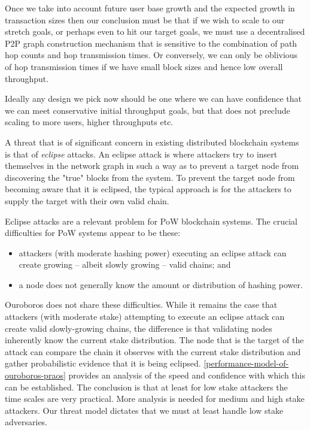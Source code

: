 \documentclass[11pt,a4paper]{article}
\begin{document}
Once we take into account future user base growth and the expected
growth in transaction sizes then our conclusion must be that if we wish
to scale to our stretch goals, or perhaps even to hit our target goals,
we must use a decentralised P2P graph construction mechanism that is
sensitive to the combination of path hop counts and hop transmission
times. Or conversely, we can only be oblivious of hop transmission times
if we have small block sizes and hence low overall throughput.

Ideally any design we pick now should be one where we can have
confidence that we can meet conservative initial throughput goals, but
that does not preclude scaling to more users, higher throughputs etc.

A threat that is of significant concern in existing distributed
blockchain systems is that of \emph{eclipse} attacks. An eclipse attack
is where attackers try to insert themselves in the network graph in such
a way as to prevent a target node from discovering the "true" blocks
from the system. To prevent the target node from becoming aware that it
is eclipsed, the typical approach is for the attackers to supply the
target with their own valid chain.

Eclipse attacks are a relevant problem for PoW blockchain systems. The
crucial difficulties for PoW systems appear to be these:

\begin{itemize}
\item
  attackers (with moderate hashing power) executing an eclipse attack
  can create growing -- albeit slowly growing -- valid chains; and
\item
  a node does not generally know the amount or distribution of hashing
  power.
\end{itemize}

Ouroboros does not share these difficulties. While it remains the case
that attackers (with moderate stake) attempting to execute an eclipse
attack can create valid slowly-growing chains, the difference is that
validating nodes inherently know the current stake distribution. The
node that is the target of the attack can compare the chain it observes
with the current stake distribution and gather probabilistic evidence
that it is being eclipsed.
\cref{performance-model-of-ouroboros-praos}
provides an analysis of the speed and confidence with which this can be
established. The conclusion is that at least for low stake attackers the
time scales are very practical. More analysis is needed for medium and
high stake attackers. Our threat model dictates that we must at least
handle low stake adversaries.
\end{document}

